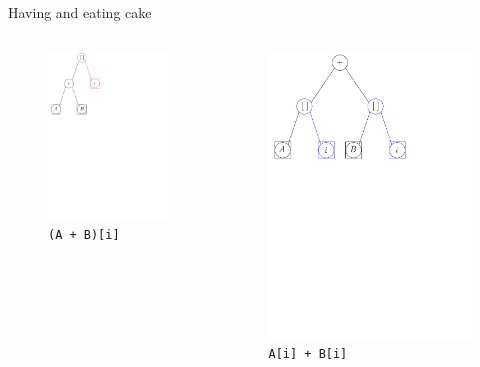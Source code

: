 \documentclass[xcolor=dvipsnames]{beamer}
\begin{document}
\begin{frame}[fragile]{Having and eating cake}
  \begin{columns}[T] %
    \begin{column}{0.35\textwidth}
      \begin{figure}[H]
        \centering
        \includegraphics[width=4.3cm]{fig_expr_cb}
        \caption*{\texttt{(A + B)[i]}}
      \end{figure}
    \end{column}%
    \hfill%
    \begin{column}{0.55\textwidth}
      \begin{figure}[H]
        \centering
        \includegraphics[width=7cm]{fig_expr_opt_cb}
        \caption*{\texttt{A[i] + B[i]}}
      \end{figure}
    \end{column}%
  \end{columns}
\end{frame}
\end{document}
